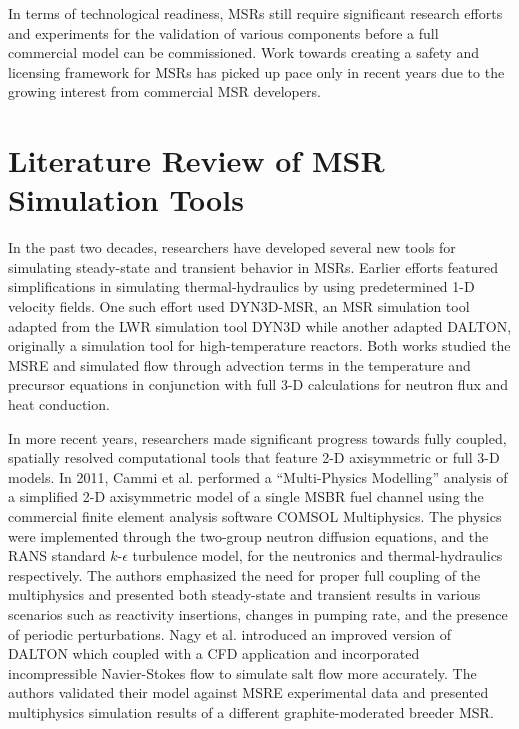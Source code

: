 In terms of technological readiness, \glspl{MSR} still require significant
research efforts and experiments for the validation of
various components before a full commercial model can be commissioned. Work
towards creating a safety and licensing framework for \glspl{MSR} has picked
up pace only in recent years due to the growing interest from commercial
\gls{MSR} developers.

\section{Literature Review of MSR Simulation Tools} \label{sec:litrev}

In the past two decades, researchers have developed several
new tools for simulating steady-state and transient behavior in \glspl{MSR}.
Earlier efforts featured simplifications in simulating
thermal-hydraulics by using predetermined 1-D velocity fields. One such effort
\cite{krepel_dyn3d-msr_2007} used DYN3D-MSR, an \gls{MSR} simulation tool
adapted from the \gls{LWR} simulation tool DYN3D while another
\cite{kophazi_development_2009} adapted DALTON, originally a simulation
tool for high-temperature reactors. Both works studied the \gls{MSRE} and
simulated flow through advection terms in the temperature and precursor
equations in conjunction with full 3-D calculations for neutron flux and heat
conduction.

In more recent years, researchers made significant progress towards fully
coupled, spatially resolved computational tools that feature
2-D axisymmetric or full 3-D models. In 2011, Cammi et al.
\cite{cammi_multi-physics_2011} performed a ``Multi-Physics Modelling''
analysis
of a simplified 2-D axisymmetric model of a single \gls{MSBR} fuel channel
using the commercial finite element analysis software COMSOL Multiphysics. The
physics were implemented through the two-group neutron diffusion equations,
and the \gls{RANS} standard $k$-$\epsilon$ turbulence model, for the
neutronics and thermal-hydraulics respectively. The
authors emphasized the need for proper full coupling of the multiphysics and
presented both steady-state and transient results in various
scenarios such as reactivity insertions, changes in pumping rate, and the
presence of periodic perturbations. Nagy et al. \cite{nagy_steady-state_2014}
introduced an improved version of DALTON which coupled with a \gls{CFD}
application and incorporated incompressible
Navier-Stokes flow to simulate salt flow more accurately. The authors
validated their model against \gls{MSRE} experimental data and presented
multiphysics simulation results of a different graphite-moderated breeder
\gls{MSR}.

